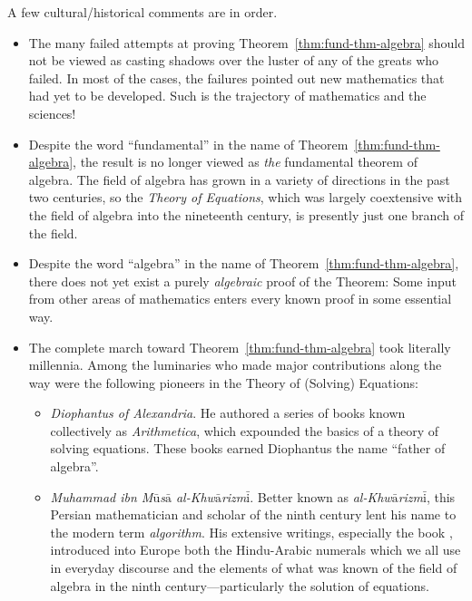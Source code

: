 A few cultural/historical comments are in order.
\begin{itemize}
\item
The many failed attempts at proving Theorem~\ref{thm:fund-thm-algebra} should not be viewed as casting shadows over the luster of any of the greats who failed.  In most of the cases, the failures pointed out new mathematics that had yet to be developed.  Such is the trajectory of mathematics and the sciences!
\medskip\item
Despite the word ``fundamental'' in the name of Theorem~\ref{thm:fund-thm-algebra}, the result is no longer viewed as {\em the} fundamental theorem of algebra.  The field of algebra has grown in a variety of directions in the past two centuries, so the {\em Theory of Equations}, which was largely coextensive with the field of algebra into the nineteenth century, is presently just one branch of the field.
\medskip\item
Despite the word ``algebra'' in the name of Theorem~\ref{thm:fund-thm-algebra}, there does not yet exist a purely {\em algebraic} proof of the Theorem: Some input from other areas of mathematics enters every known proof in some essential way.
\medskip\item
The complete march toward Theorem~\ref{thm:fund-thm-algebra} took literally millennia.  Among the luminaries who made major contributions along the way were the following pioneers in the Theory of (Solving) Equations:
  \begin{itemize}
  \item
{\it Diophantus of Alexandria}.  He authored a series of books known collectively as {\it Arithmetica}, which expounded the basics of a theory of solving equations.  These books earned Diophantus the name ``father of algebra''.
   \medskip\item
{\it Muhammad ibn M$\bar{\mbox{u}}$s$\bar{\mbox{a}}$ al-Khw$\bar{\mbox{a}}$rizm$\bar{\mbox{i}}$}.  Better known as {\em al-Khw$\bar{\mbox{a}}$rizm$\bar{\mbox{i}}$}, this Persian mathematician and scholar of the ninth century lent his name to the modern term {\it algorithm}.  His extensive writings, especially the book \cite{Al-Khwarizmi}, introduced into Europe both the Hindu-Arabic numerals which we all use in everyday discourse and the elements of what was known of the field of algebra in the ninth century---particularly the solution of equations.

\medskip

\end{itemize}
\end{itemize}
